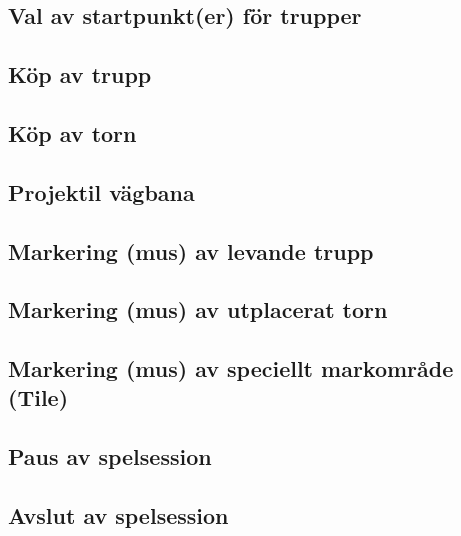 \documentclass[10pt]{article}
\begin{document}
	\subsection{Val av startpunkt(er) för trupper}
	\subsection{Köp av trupp}
	\subsection{Köp av torn}
	\subsection{Projektil vägbana}
	\subsection{Markering (mus) av levande trupp}
	\subsection{Markering (mus) av utplacerat torn}
	\subsection{Markering (mus) av speciellt markområde (Tile)}
	\subsection{Paus av spelsession}
	\subsection{Avslut av spelsession}
	
\end{document}
